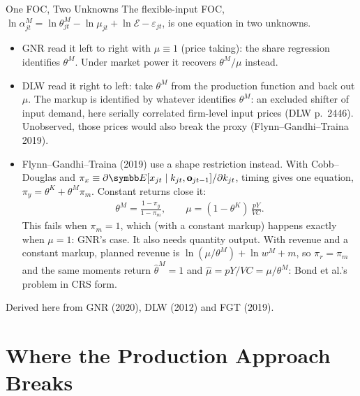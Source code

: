\documentclass[aspectratio=169,10pt]{beamer}
\begin{document}
\begin{frame}{One FOC, Two Unknowns}
\small
The flexible-input FOC, $\ln \alpha^M_{jt} = \ln \theta^M_{jt} - \ln \mu_{jt} + \ln \mathcal{E} - \varepsilon_{jt}$, is one equation in two unknowns.
\begin{itemize}
\item \alert{GNR} read it left to right with $\mu \equiv 1$ (price taking): the share regression identifies $\theta^M$. Under market power it recovers $\theta^M/\mu$ instead.
\item \alert{DLW} read it right to left: take $\theta^M$ from the production function and back out $\mu$. The markup is identified by whatever identifies $\theta^M$: an \alert{excluded shifter} of input demand, here serially correlated firm-level input prices (DLW p.\ 2446). Unobserved, those prices would also break the proxy (Flynn--Gandhi--Traina 2019).
\item \alert{Flynn--Gandhi--Traina (2019)} use a shape restriction instead. With Cobb--Douglas and $\pi_x \equiv \partial\E[x_{jt} \mid k_{jt}, \mathbf{o}_{jt-1}]/\partial k_{jt}$, timing gives one equation, $\pi_y = \theta^K + \theta^M \pi_m$. Constant returns close it:
\begin{align*}
\theta^M = \frac{1 - \pi_y}{1 - \pi_m}, \qquad \mu = (1 - \theta^K)\,\frac{pY}{VC}.
\end{align*}
This fails when $\pi_m = 1$, which (with a constant markup) happens exactly when $\mu = 1$: GNR's case. It also needs \alert{quantity} output. With revenue and a constant markup, planned revenue is $\ln(\mu/\theta^M) + \ln w^M + m$, so $\pi_r = \pi_m$ and the same moments return $\hat\theta^M = 1$ and $\hat\mu = pY/VC = \mu/\theta^M$: Bond et al.'s problem in CRS form.
\end{itemize}
{\footnotesize Derived here from GNR (2020), DLW (2012) and FGT (2019).}
\end{frame}


\section{Where the Production Approach Breaks}
\end{document}
